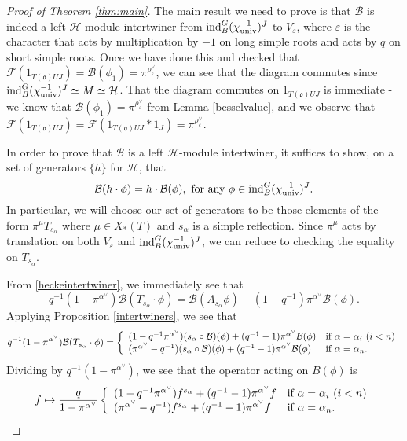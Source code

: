 \documentclass[11pt,letterpaper]{article}
\newcommand{\calH}{\mathcal{H}} %
\newcommand{\calB}{\mathcal{B}}
\newcommand{\calF}{\mathcal{F}}
\newcommand{\ve}{\varepsilon}
\newcommand{\goth}{\mathfrak}
\newcommand{\ind}{\textup{ind}}
\theoremstyle{remark}
\numberwithin{equation}{section}
\begin{document}
\begin{proof}[Proof of Theorem \ref{thm:main}]
The main result we need to prove is that $\calB$ is indeed a left $\calH$-module intertwiner from $\ind_B^G(\chi_{\textup{univ}}^{-1})^J$ to $V_{\ve}$, where $\ve$ is the character that acts by multiplication by $-1$ on long simple roots and acts by $q$ on short simple roots. Once we have done this and checked that $\calF(1_{T(\goth{o})UJ}) = \calB(\phi_1) = \pi^{\rho_{\ve}^{\vee}}$, we can see that the diagram commutes since $\ind_B^G(\chi_{\textup{univ}}^{-1})^J \simeq M \simeq \calH$. That the diagram commutes on $1_{T(\goth{o})UJ}$ is immediate - we know that $\calB(\phi_1) = \pi^{\rho_{\ve}^{\vee}}$ from Lemma \ref{besselvalue}, and we observe that $\calF(1_{T(\goth{o})UJ}) = \calF(1_{T(\goth{o})UJ} \ast 1_J) = \pi^{\rho_{\ve}^{\vee}}$.


In order to prove that $\calB$ is a left $\calH$-module intertwiner, it suffices to show, on a set of generators $\{h\}$ for $\calH$, that $$\calB(h\cdot \phi) = h\cdot \calB(\phi), \textup{ for any $\phi \in \ind_B^G(\chi_{\textup{univ}}^{-1})^J.$}$$ In particular, we will choose our set of generators to be those elements of the form $\pi^{\mu}T_{s_{\alpha}}$ where $\mu \in X_{\ast}(T)$ and $s_{\alpha}$ is a simple reflection. Since $\pi^{\mu}$ acts by translation on both $V_{\ve}$ and $\ind_B^G(\chi_{\textup{univ}}^{-1})^J$, we can reduce to checking the equality on $T_{s_{\alpha}}$.

From \eqref{heckeintertwiner}, we immediately see that $$q^{-1}(1-\pi^{\alpha^{\vee}})\calB(T_{s_{\alpha}}\cdot \phi) = \calB(A_{s_{\alpha}}\phi)- (1-q^{-1})\pi^{\alpha^{\vee}}\calB(\phi).$$ Applying Proposition \ref{intertwiners}, we see that $$q^{-1}(1-\pi^{\alpha^{\vee}})\calB(T_{s_{\alpha}}\cdot \phi) = \left\{\begin{array}{ll} (1-q^{-1}\pi^{\alpha^{\vee}})(s_{\alpha}\circ \calB)(\phi) + (q^{-1}-1)\pi^{\alpha^{\vee}}\calB(\phi) & \textup{if $\alpha = \alpha_i$ $(i<n)$} \\ (\pi^{\alpha^{\vee}}-q^{-1})(s_{\alpha}\circ \calB)(\phi) + (q^{-1}-1)\pi^{\alpha^{\vee}}\calB(\phi) & \textup{if $\alpha = \alpha_n$.} \end{array}\right.$$ Dividing by $q^{-1}(1-\pi^{\alpha^{\vee}})$, we see that the operator acting on $B(\phi)$ is $$f \mapsto \frac{q}{1-\pi^{\alpha^{\vee}}}\left\{\begin{array}{ll} (1-q^{-1}\pi^{\alpha^{\vee}}) f^{s_{\alpha}} + (q^{-1}-1)\pi^{\alpha^{\vee}}f & \textup{if $\alpha = \alpha_i$ $(i<n)$} \\ (\pi^{\alpha^{\vee}}-q^{-1})f^{s_{\alpha}} + (q^{-1}-1)\pi^{\alpha^{\vee}}f & \textup{if $\alpha = \alpha_n$.} \end{array}\right.$$




\end{proof}
\end{document}
